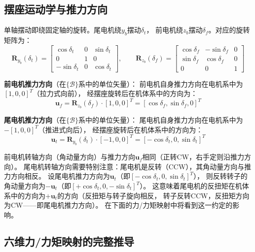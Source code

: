 \documentclass[a4paper,12pt]{ctexart}
\theoremstyle{plain}
\theoremstyle{definition}
\begin{document}
\subsection{摆座运动学与推力方向}

单轴摆动即绕固定轴的旋转。尾电机绕$y_b$摆动$\delta_t$，
前电机绕$z_b$摆动$\delta_f$。对应的旋转矩阵为：
\begin{equation}
    \bm{R}_{y_b}(\delta_t) = \begin{bmatrix}
        \cos\delta_t & 0 & \sin\delta_t \\
        0 & 1 & 0 \\
        -\sin\delta_t & 0 & \cos\delta_t
    \end{bmatrix}, \qquad
    \bm{R}_{z_b}(\delta_f) = \begin{bmatrix}
        \cos\delta_f & -\sin\delta_f & 0 \\
        \sin\delta_f & \cos\delta_f & 0 \\
        0 & 0 & 1
    \end{bmatrix}
    \label{eq:gimbal_rotations}
\end{equation}

\textbf{前电机推力方向}（在$\{\mathcal{B}\}$系中的单位矢量）：
前电机自身推力方向在电机系中为$[1,0,0]^T$（拉力式向前），
经摆座旋转后在机体系中的方向为：
\begin{equation}
    \bm{u}_f = \bm{R}_{z_b}(\delta_f) \cdot [1, 0, 0]^T
    = [\cos\delta_f, \sin\delta_f, 0]^T
\end{equation}

\textbf{尾电机推力方向}（在$\{\mathcal{B}\}$系中的单位矢量）：
尾电机自身推力方向在电机系中为$-[1,0,0]^T$（推进式向后），
经摆座旋转后在机体系中的方向为：
\begin{equation}
    \bm{u}_t = \bm{R}_{y_b}(\delta_t) \cdot [-1, 0, 0]^T
    = [-\cos\delta_t, 0, \sin\delta_t]^T
\end{equation}

前电机转轴方向（角动量方向）与推力方向$\bm{u}_f$相同（正转CW，右手定则沿推力方向）。
尾电机转轴方向需要特别注意：尾电机是反转（CCW），其角动量方向与推力方向相反。
设尾电机推力方向为$\bm{u}_t$（即$[-\cos\delta_t, 0, \sin\delta_t]^T$），
则反转转子的角动量方向为$-\bm{u}_t$（即$[+\cos\delta_t, 0, -\sin\delta_t]^T$）。
这意味着尾电机的反扭矩在机体系中的方向为$+\bm{u}_t$的方向（反扭矩与转子旋向相反，
转子反转CCW，反扭矩方向为CW——即尾电机推力方向）。
在下面的力/力矩映射中将看到这一约定的影响。

\subsection{六维力/力矩映射的完整推导}
\end{document}
